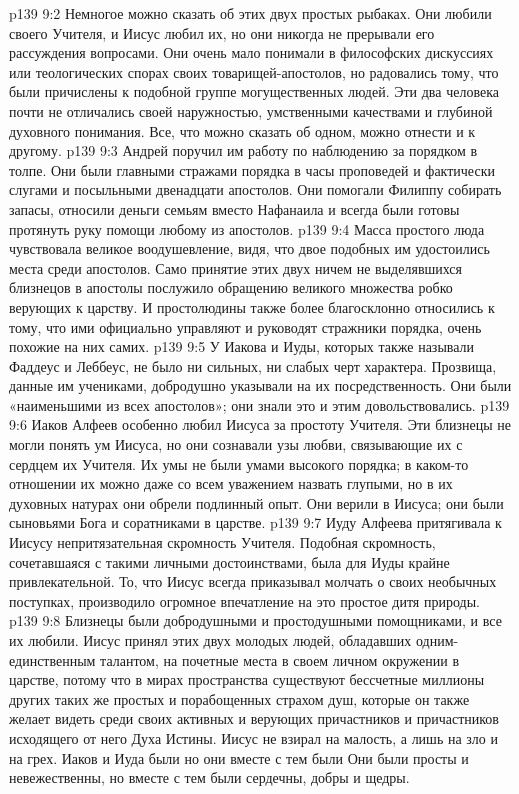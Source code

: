 \vs p139 9:2 \pc Немногое можно сказать об этих двух простых рыбаках. Они любили своего Учителя, и Иисус любил их, но они никогда не прерывали его рассуждения вопросами. Они очень мало понимали в философских дискуссиях или теологических спорах своих товарищей\hyp{}апостолов, но радовались тому, что были причислены к подобной группе могущественных людей. Эти два человека почти не отличались своей наружностью, умственными качествами и глубиной духовного понимания. Все, что можно сказать об одном, можно отнести и к другому.
\vs p139 9:3 Андрей поручил им работу по наблюдению за порядком в толпе. Они были главными стражами порядка в часы проповедей и фактически слугами и посыльными двенадцати апостолов. Они помогали Филиппу собирать запасы, относили деньги семьям вместо Нафанаила и всегда были готовы протянуть руку помощи любому из апостолов.
\vs p139 9:4 Масса простого люда чувствовала великое воодушевление, видя, что двое подобных им удостоились места среди апостолов. Само принятие этих двух ничем не выделявшихся близнецов в апостолы послужило обращению великого множества робко верующих к царству. И простолюдины также более благосклонно относились к тому, что ими официально управляют и руководят стражники порядка, очень похожие на них самих.
\vs p139 9:5 У Иакова и Иуды, которых также называли Фаддеус и Леббеус, не было ни сильных, ни слабых черт характера. Прозвища, данные им учениками, добродушно указывали на их посредственность. Они были «наименьшими из всех апостолов»; они знали это и этим довольствовались.
\vs p139 9:6 \pc Иаков Алфеев особенно любил Иисуса за простоту Учителя. Эти близнецы не могли понять ум Иисуса, но они сознавали узы любви, связывающие их с сердцем их Учителя. Их умы не были умами высокого порядка; в каком\hyp{}то отношении их можно даже со всем уважением назвать глупыми, но в их духовных натурах они обрели подлинный опыт. Они верили в Иисуса; они были сыновьями Бога и соратниками в царстве.
\vs p139 9:7 Иуду Алфеева притягивала к Иисусу непритязательная скромность Учителя. Подобная скромность, сочетавшаяся с такими личными достоинствами, была для Иуды крайне привлекательной. То, что Иисус всегда приказывал молчать о своих необычных поступках, производило огромное впечатление на это простое дитя природы.
\vs p139 9:8 \pc Близнецы были добродушными и простодушными помощниками, и все их любили. Иисус принял этих двух молодых людей, обладавших одним\hyp{}единственным талантом, на почетные места в своем личном окружении в царстве, потому что в мирах пространства существуют бессчетные миллионы других таких же простых и порабощенных страхом душ, которые он также желает видеть среди своих активных и верующих причастников и причастников исходящего от него Духа Истины. Иисус не взирал на малость, а лишь на зло и на грех. Иаков и Иуда были  но они вместе с тем были  Они были просты и невежественны, но вместе с тем были сердечны, добры и щедры.
